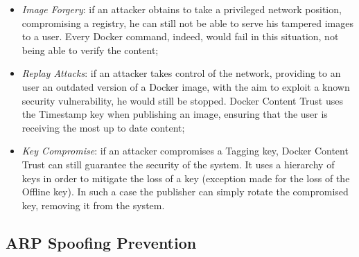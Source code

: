 \documentclass[a4paper,12pt]{article}
\begin{document}
\begin{itemize}
  \item \textit{Image Forgery}: if an attacker obtains to take a privileged
  network position, compromising a registry, he can still not be able to serve
  his tampered images to a user. Every Docker command, indeed, would fail in
  this situation, not being able to verify the content;
  \item \textit{Replay Attacks}: if an attacker takes control of the network,
  providing to an user an outdated version of a Docker image, with the aim to
  exploit a known security vulnerability, he would still be stopped. Docker
  Content Trust uses the Timestamp key when publishing an image, ensuring that
  the user is receiving the most up to date content;
  \item \textit{Key Compromise}: if an attacker compromises a Tagging key,
  Docker Content Trust can still guarantee the security of the system. It uses a
  hierarchy of keys in order to mitigate the loss of a key (exception made for
  the loss of the Offline key). In such a case the publisher can simply rotate
  the compromised key, removing it from the system. 
\end{itemize}

\subsection{ARP Spoofing Prevention}
\end{document}
